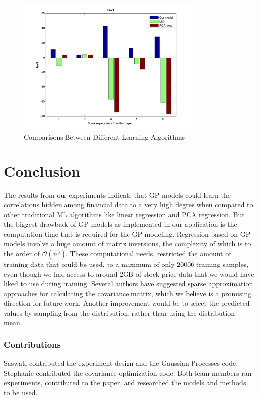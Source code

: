 \documentclass{article} %
\begin{document}
\begin{figure}[h]
	\label{fig4}
	\centering
	\includegraphics[width=0.8\textwidth]{../code/fig_4.png}
	\caption{Comparisons Between Different Learning Algorithms}
\end{figure}

\section{Conclusion}
The results from our experiments indicate that GP models could learn the correlations hidden among financial data to a very high degree when compared to other traditional ML algorithms like linear regression and PCA regression. But the biggest drawback of GP models as implemented in our application is the computation time that is required for the GP modeling. Regression based on GP models involve a huge amount of matrix inversions, the complexity of which is to the order of $\mathcal{O}(n^3)$. These computational needs, restricted the amount of training data that could be used, to a maximum of only 20000 training samples, even though we had access to around 2GB of stock price data that we would have liked to use during training. Several authors have suggested sparse approximation approaches for calculating the covariance matrix, which we believe is a promising direction for future work.
Another improvement would be to select the predicted values by sampling from the distribution, rather than using the distribution mean.

\subsubsection*{Contributions}
Saswati contributed the experiment design and the Gaussian Processes code.
Stephanie contributed the covariance optimization code.
Both team members ran experiments, contributed to the paper, and researched the models and methods to be used.
\end{document}
